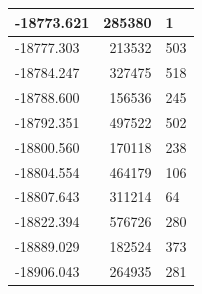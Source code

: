 \documentclass[]{book}
\theoremstyle{definition}
\theoremstyle{definition}
\theoremstyle{definition}
\theoremstyle{remark}
\begin{document}
\begin{tabular}{l|r|l}
\hline
-18773.621 & 285380 & 1\\
\hline
-18777.303 & 213532 & 503\\
\hline
-18784.247 & 327475 & 518\\
\hline
-18788.600 & 156536 & 245\\
\hline
-18792.351 & 497522 & 502\\
\hline
-18800.560 & 170118 & 238\\
\hline
-18804.554 & 464179 & 106\\
\hline
-18807.643 & 311214 & 64\\
\hline
-18822.394 & 576726 & 280\\
\hline
-18889.029 & 182524 & 373\\
\hline
-18906.043 & 264935 & 281\\
\hline
\end{tabular}
\end{document}
